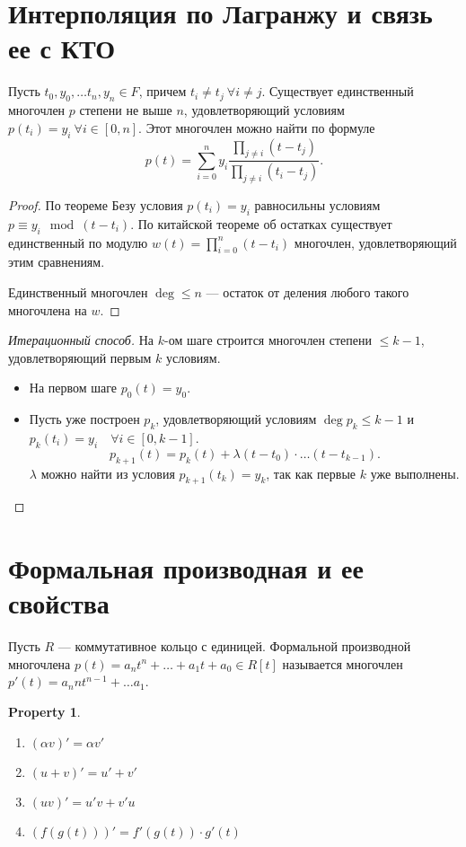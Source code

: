 \documentclass[11pt]{book}
\renewcommand{\le}{\leqslant}
\theoremstyle{definition}
\theoremstyle{plain}
\theoremstyle{plain}
\newtheorem*{prop}{Property}
\theoremstyle{definition}
\theoremstyle{remark}
\begin{document}
 \section{Интерполяция по Лагранжу и связь ее с КТО}
 \begin{thm}
     Пусть $ t_0, y_0, \ldots t_n, y_n \in F$, причем $ t_i \ne  t_j ~ \forall i \ne j$. Существует единственный многочлен $ p$ степени не выше  $ n$, удовлетворяющий условиям  $ p(t_i) = y_i ~ \forall i \in [0, n]$. Этот многочлен можно найти по формуле
     \[
	 p(t) = \sum_{i = 0}^{n} y_i \frac{\prod_{j \ne  i}(t-t_j)}{\prod_{j \ne  i}(t_i - t_j)}
     .\] 
 \end{thm}
 \begin{proof}
     По теореме Безу условия $ p(t_i) = y_i $  равносильны условиям  $ p \equiv y_{i} \mod (t - t_i)$. По китайской теореме об остатках существует единственный по модулю $ w(t) = \prod\limits_{i = 0}^{n}(t-t_i)$ многочлен, удовлетворяющий этим сравнениям.

     Единственный многочлен $ \deg \le n $ --- остаток от деления любого такого многочлена на $ w$.
 \end{proof}
 \begin{proof}[Итерационный способ]
     На $ k$-ом шаге строится многочлен степени  $ \le k-1$, удовлетворяющий первым $ k$ условиям.

     \begin{itemize}
	 \item 
     На первом шаге  $ p_0(t) = y_0$.
 \item Пусть уже построен $ p_k$, удовлетворяющий условиям  $ \deg p_k \le k -1$ и $ p_k(t_i) = y_i \quad \forall i \in [0, k-1]$.
   \[
       p_{k+1} (t) = p_k(t) + \lambda(t - t_0 ) \cdot  \ldots  (t - t_{k-1})
   .\]  
   $ \lambda$ можно найти из условия  $ p_{k+1}(t_{k}) = y_k$, так как первые $ k$ уже выполнены. 
     \end{itemize}
     
 \end{proof}
\section{Формальная производная и ее свойства}
\begin{defn}
     Пусть $ R$ --- коммутативное кольцо с единицей. {\sf Формальной производной многочлена } $ p(t) = a_n t ^{n} + \ldots + a_1t+ a_0 \in R[t]$ называется многочлен $ p'(t) = a_n n t ^{n -1} + \ldots a_1$.
\end{defn}
\begin{prop}
    $ $
    \begin{enumerate}[noitemsep]
	\item  $ (\alpha v)' = \alpha  v' $
	\item  $ (u+ v)' = u'+  v' $
	\item $
		    (uv)' = u' v + v' u
		    $
	\item  $ \left( f(g(t)) \right) ' = f'(g(t)) \cdot g'(t)$
    \end{enumerate}
\end{prop}
\end{document}
